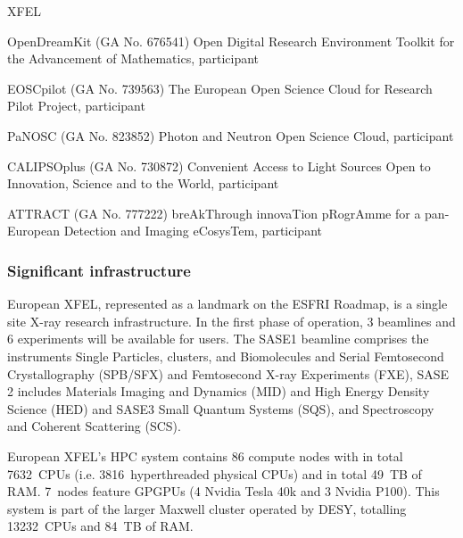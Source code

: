 \begin{sitedescription}{XFEL}
\begin{compactenum}
\item OpenDreamKit (GA No. 676541) Open Digital Research Environment
  Toolkit for the Advancement of Mathematics, participant
\item EOSCpilot (GA No. 739563) The European Open Science Cloud for
  Research Pilot Project, participant
\item PaNOSC (GA No. 823852) Photon and Neutron Open Science Cloud,
  participant
\item CALIPSOplus (GA No. 730872) Convenient Access to Light Sources
  Open to Innovation, Science and to the World, participant
\item ATTRACT (GA No. 777222) breAkThrough innovaTion pRogrAmme for a
  pan-European Detection and Imaging eCosysTem, participant

\end{compactenum}

\subsubsection*{Significant infrastructure}

European XFEL, represented as a landmark on the ESFRI Roadmap, is a
single site X-ray research infrastructure. In the first phase of
operation, 3 beamlines and 6 experiments will be available for
users. The SASE1 beamline comprises the instruments Single Particles,
clusters, and Biomolecules and Serial Femtosecond Crystallography
(SPB/SFX) and Femtosecond X-ray Experiments (FXE), SASE 2 includes
Materials Imaging and Dynamics (MID) and High Energy Density Science
(HED) and SASE3 Small Quantum Systems (SQS), and Spectroscopy and
Coherent Scattering (SCS).

European XFEL's HPC system contains 86 compute nodes with in total
7632~CPUs (i.e. 3816~hyperthreaded physical CPUs) and in total 49~TB
of RAM. 7~nodes feature GPGPUs (4 Nvidia Tesla 40k and 3 Nvidia
P100). This system is part of the larger Maxwell cluster operated by
DESY, totalling 13232~CPUs and 84~TB of RAM.

\end{sitedescription}







